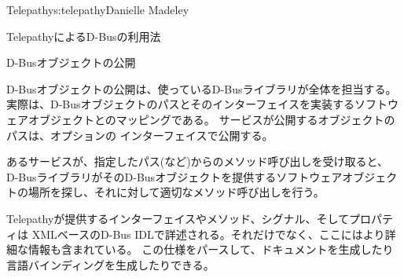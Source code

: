 \begin{aosachapter}{Telepathy}{s:telepathy}{Danielle Madeley}
\begin{aosasect1}{TelepathyによるD-Busの利用法}

\begin{aosabox}{D-Busオブジェクトの公開}

D-Busオブジェクトの公開は、使っているD-Busライブラリが全体を担当する。
実際は、D-Busオブジェクトのパスとそのインターフェイスを実装するソフトウェアオブジェクトとのマッピングである。
サービスが公開するオブジェクトのパスは、オプションの
インターフェイスで公開する。

あるサービスが、指定したパス(など)からのメソッド呼び出しを受け取ると、
D-BusライブラリがそのD-Busオブジェクトを提供するソフトウェアオブジェクトの場所を探し、それに対して適切なメソッド呼び出しを行う。

\end{aosabox}

Telepathyが提供するインターフェイスやメソッド、シグナル、そしてプロパティは
XMLベースのD-Bus IDLで詳述される。それだけでなく、ここにはより詳細な情報も含まれている。
この仕様をパースして、ドキュメントを生成したり言語バインディングを生成したりできる。


\end{aosasect1}
\end{aosachapter}
